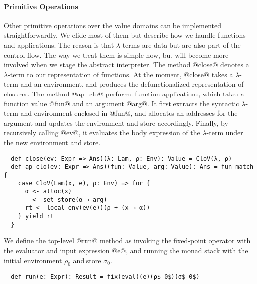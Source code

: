 \paragraph{Primitive Operations}
Other primitive operations over the value domains can be implemented
straightforwardly. We elide most of them but describe how we handle
functions and applications. The reason is that $\lambda$-terms are data but are also
part of the control flow. The way we treat them is simple now, but
will become more involved when we stage the abstract interpreter.
The method @close@ denotes a $\lambda$-term to our representation of functions.
At the moment, @close@ takes a $\lambda$-term and an environment, and
produces the defunctionalized representation of closures.
The method @ap_clo@ performs function applications, which takes a function
value @fun@ and an argument @arg@. It first extracts the syntactic
$\lambda$-term and environment enclosed in @fun@, and allocates an addresses
for the argument and updates the environment and store accordingly.  Finally,
by recursively calling @ev@, it evaluates the body expression of the
$\lambda$-term under the new environment and store.
\begin{lstlisting}
  def close(ev: Expr => Ans)(λ: Lam, ρ: Env): Value = CloV(λ, ρ)
  def ap_clo(ev: Expr => Ans)(fun: Value, arg: Value): Ans = fun match {
    case CloV(Lam(x, e), ρ: Env) => for {
      α <- alloc(x)
      _ <- set_store(α → arg)
      rt <- local_env(ev(e))(ρ + (x → α))
    } yield rt
  }
\end{lstlisting}

We define the top-level @run@ method as invoking the fixed-point operator with
the evaluator and input expression @e@, and running the monad stack with the
initial environment $\rho_0$ and store $\sigma_0$.
\begin{lstlisting}
  def run(e: Expr): Result = fix(eval)(e)(ρ$_0$)(σ$_0$)
\end{lstlisting}
